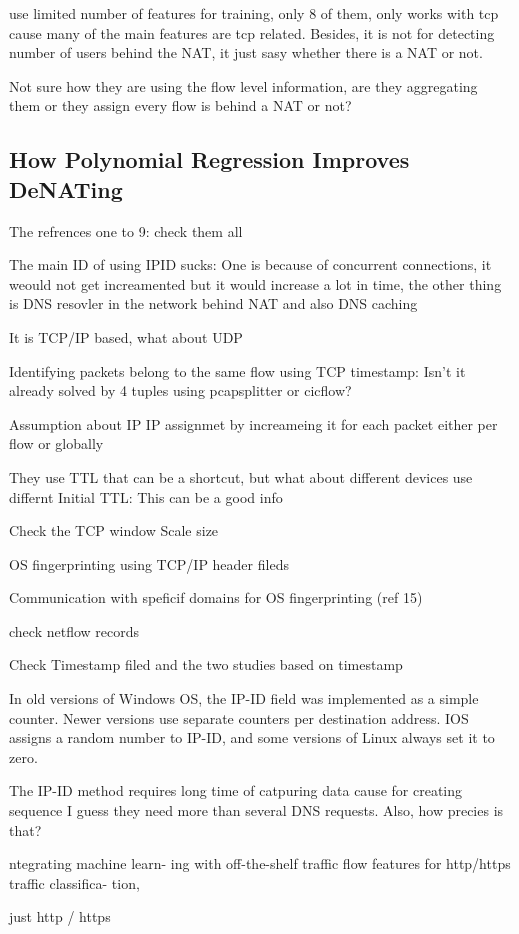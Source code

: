 use limited number of features for training, only 8 of them, only works with tcp cause many of the main features are tcp related. Besides, it is not for detecting number of users behind the NAT, it just sasy whether there is a NAT or not.

Not sure how they are using the flow level information, are they aggregating them or they assign every flow is behind a NAT or not? 



\subsection{How Polynomial Regression Improves DeNATing \cite{adler2023polynomial}}
The refrences one to 9: check them all

The main ID of using IPID sucks: One is because of concurrent connections, it weould not get increamented but it would increase a lot in time, the other thing is DNS resovler in the network behind NAT and also DNS caching 

It is TCP/IP based, what about UDP 

Identifying packets belong to the same flow using TCP timestamp: Isn't it already solved by 4 tuples using pcapsplitter or cicflow?


Assumption about IP IP assignmet by increameing it for each packet either per flow or globally

They use TTL that can be a shortcut, but what about different devices use differnt Initial TTL: This can be a good info 

Check the TCP window Scale size 

OS fingerprinting using TCP/IP header fileds 

Communication with speficif domains for OS fingerprinting (ref 15)

check netflow records 

Check Timestamp filed and the two studies based on timestamp

In old versions of Windows OS, the IP-ID field was
implemented as a simple counter. Newer versions use separate
counters per destination address. IOS assigns a random number
to IP-ID, and some versions of Linux always set it to zero.

The IP-ID method requires long time of catpuring data cause for creating sequence I guess they need more than several DNS requests. Also, how precies is that?


ntegrating machine learn- ing with off-the-shelf traffic flow features for http/https traffic classifica- tion,

just http / https 